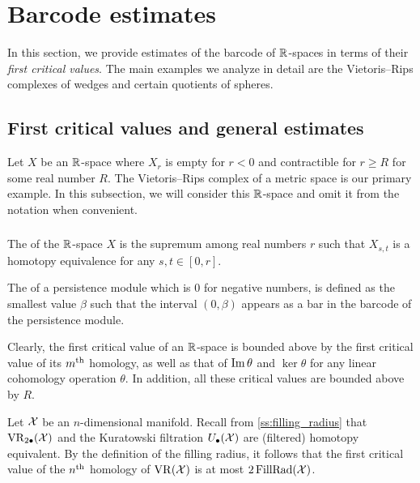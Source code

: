 
\section{Barcode estimates}\label{s:computations}

In this section, we provide estimates of the barcode of $\mathbb{R}$-spaces in terms of their \textit{first critical values}.
The main examples we analyze in detail are the Vietoris--Rips complexes of wedges and certain quotients of spheres.

\subsection{First critical values and general estimates}\label{sub:general_barcodes}

Let $X$ be an $\mathbb{R}$-space where $X_r$ is empty for $r<0$ and contractible for $r\geq R$ for some real number $R$.
The Vietoris--Rips complex of a metric space is our primary example.
In this subsection, we will consider this $\mathbb{R}$-space and omit it from the notation when convenient.

\subsubsection{}\label{subsub:first_critical_value}
\label{subsub:beta v.s. fillrad}
The  of the $\mathbb{R}$-space $X$ is the supremum among real numbers $r$ such that $X_{s,t}$ is a homotopy equivalence for any $s,t \in [0,r]$.

The  of a persistence module which is \(0\) for negative numbers, is defined as the smallest value \(\beta\) such that the interval \((0, \beta)\) appears as a bar in the barcode of the persistence module.

Clearly, the first critical value of an $\mathbb{R}$-space is bounded above by the first critical value of its $m^{\mathrm{th}}$ homology, as well as that of \(\operatorname{Im}\theta\) and \(\ker\theta\) for any linear cohomology operation $\theta$.
In addition, all these critical values are bounded above by $R$.

\medskip \remark
Let $\mathcal{X}$ be an $n$-dimensional manifold.
Recall from \cref{ss:filling_radius} that $\operatorname{VR}_{2\bullet}(\mathcal{X})$ and the Kuratowski filtration $U_\bullet(\mathcal{X})$ are (filtered) homotopy equivalent.
By the definition of the filling radius, it follows that the first critical value of the $n^{\mathrm{th}}$ homology of $\operatorname{VR}(\mathcal{X})$ is at most $2\operatorname{FillRad}(\mathcal{X})$.

